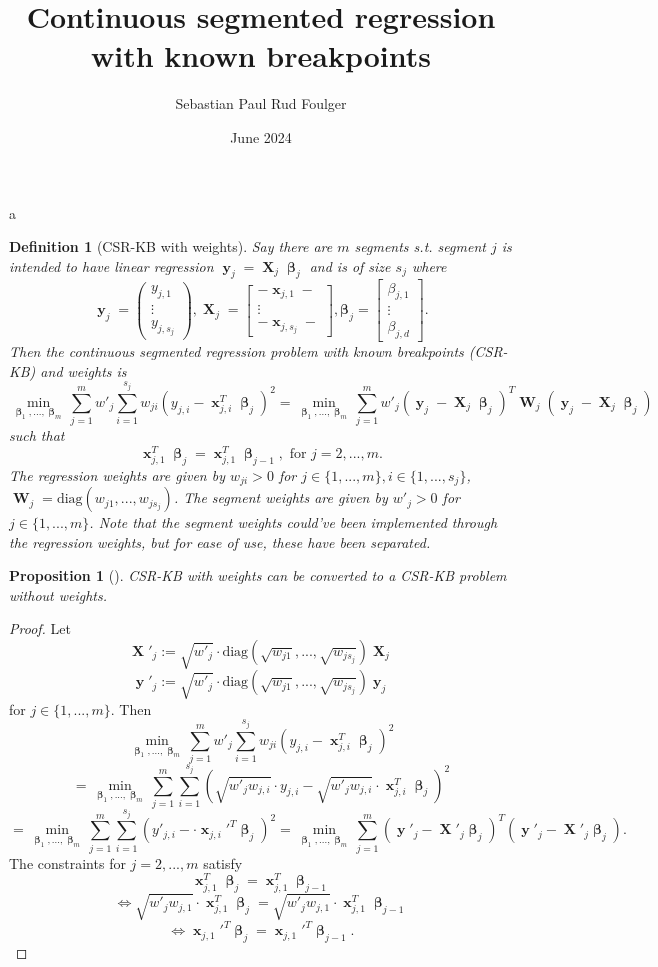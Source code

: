 \documentclass[12pt]{article}
\title{Continuous segmented regression with known breakpoints}
\author{Sebastian Paul Rud Foulger}
\date{June 2024}
\DeclareMathOperator{\bx}{\textbf{x}}
\DeclareMathOperator{\bX}{\textbf{X}}
\DeclareMathOperator{\by}{\textbf{y}}
\DeclareMathOperator{\bW}{\textbf{W}}
\DeclareMathOperator{\bbeta}{\boldsymbol{\beta}}
\newtheorem{defn}{Definition}
\newtheorem{prop}{Proposition}
\begin{document}
a\begin{defn}[CSR-KB with weights]
Say there are $m$ segments s.t. segment $j$ is intended to have linear regression $\by_j = \bX_j \bbeta_j$ and is of size $s_j$ where
$$\by_j = \begin{pmatrix}
y_{j,1} \\
\vdots \\
y_{j,s_j}
\end{pmatrix}, \bX_j = 
\begin{bmatrix}
-\bx_{j,1}-  \\
\vdots \\
-\bx_{j,s_j}-
\end{bmatrix}, \boldsymbol{\beta}_j = 
\begin{bmatrix}
\beta_{j,1}  \\
\vdots \\
\beta_{j,d}
\end{bmatrix}.$$
Then the continuous segmented regression problem with known breakpoints (CSR-KB) and weights is
$$\min_{\bbeta_1,...,\bbeta_m} \sum_{j=1}^m w'_j\sum_{i=1}^{s_j} w_{ji}(y_{j, i}-\bx_{j, i}^T\bbeta_j)^2 = \min_{\bbeta_1,...,\bbeta_m} \sum_{j=1}^m w'_j (\by_j-\bX_j\bbeta_j)^T\bW_j(\by_j-\bX_j\bbeta_j)$$
such that
$$\bx_{j, 1}^T \bbeta_j = \bx_{j, 1}^T \bbeta_{j-1}, \text{ for }j=2, ..., m.$$
The regression weights are given by $w_{ji} > 0$ for $j\in \{1, ..., m\}, i \in \{1, ..., s_j\}$, $\bW_j = \text{diag}(w_{j1}, ..., w_{js_j})$. The segment weights are given by $w'_j > 0$ for $j \in \{1, ..., m\}$. Note that the segment weights could've been implemented through the regression weights, but for ease of use, these have been separated. 
\end{defn}
\begin{prop}[] \label{prop:convert}
CSR-KB with weights can be converted to a CSR-KB problem without weights.
\end{prop}
\begin{proof}
Let
$$\bX'_j := \sqrt{w'_j} \cdot \text{diag}\left(\sqrt{w_{j1}}, ..., \sqrt{w_{js_j}}\right)\bX_j$$
$$\by'_j := \sqrt{w'_j} \cdot \text{diag}\left(\sqrt{w_{j1}}, ..., \sqrt{w_{js_j}}\right)\by_j$$
for $j \in \{1, ..., m\}$. Then
$$\min_{\bbeta_1,...,\bbeta_m} \sum_{j=1}^m w'_j\sum_{i=1}^{s_j} w_{ji}(y_{j, i}-\bx_{j, i}^T\bbeta_j)^2 $$
$$=\min_{\bbeta_1,...,\bbeta_m} \sum_{j=1}^m \sum_{i=1}^{s_j} \left(\sqrt{w'_j w_{j,i}} \cdot y_{j, i}-\sqrt{w'_j w_{j,i}} \cdot \bx_{j, i}^T\bbeta_j \right)^2 $$
$$=\min_{\bbeta_1,...,\bbeta_m} \sum_{j=1}^m \sum_{i=1}^{s_j} \left(y'_{j, i}- \cdot \bx_{j, i}'^T\bbeta_j \right)^2=\min_{\bbeta_1,...,\bbeta_m} \sum_{j=1}^m (\by'_j-\bX'_j\bbeta_j)^T(\by'_j-\bX'_j\bbeta_j).$$
The constraints for $j=2, ..., m$ satisfy
$$\bx_{j, 1}^T \bbeta_j = \bx_{j, 1}^T \bbeta_{j-1}$$
$$\iff \sqrt{w'_j w_{j,1}} \cdot \bx_{j, 1}^T \bbeta_j = \sqrt{w'_j w_{j,1}} \cdot \bx_{j, 1}^T \bbeta_{j-1} $$
$$\iff \bx_{j, 1}'^T \bbeta_j = \bx_{j, 1}'^T \bbeta_{j-1}.$$
\end{proof}
\end{document}
